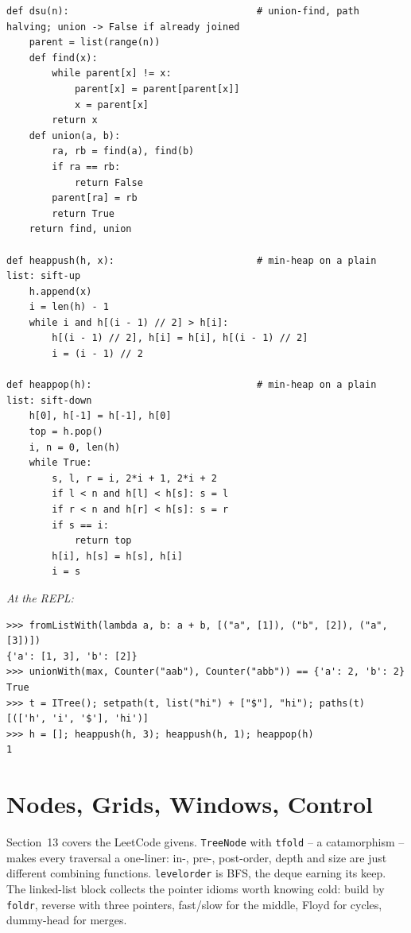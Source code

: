 \documentclass[11pt,letterpaper]{book}
\begin{document}
\begin{lstlisting}[style=code]
def dsu(n):                                 # union-find, path halving; union -> False if already joined
    parent = list(range(n))
    def find(x):
        while parent[x] != x:
            parent[x] = parent[parent[x]]
            x = parent[x]
        return x
    def union(a, b):
        ra, rb = find(a), find(b)
        if ra == rb:
            return False
        parent[ra] = rb
        return True
    return find, union

def heappush(h, x):                         # min-heap on a plain list: sift-up
    h.append(x)
    i = len(h) - 1
    while i and h[(i - 1) // 2] > h[i]:
        h[(i - 1) // 2], h[i] = h[i], h[(i - 1) // 2]
        i = (i - 1) // 2

def heappop(h):                             # min-heap on a plain list: sift-down
    h[0], h[-1] = h[-1], h[0]
    top = h.pop()
    i, n = 0, len(h)
    while True:
        s, l, r = i, 2*i + 1, 2*i + 2
        if l < n and h[l] < h[s]: s = l
        if r < n and h[r] < h[s]: s = r
        if s == i:
            return top
        h[i], h[s] = h[s], h[i]
        i = s
\end{lstlisting}

\noindent\textit{At the REPL:}
\begin{lstlisting}[style=spec]
>>> fromListWith(lambda a, b: a + b, [("a", [1]), ("b", [2]), ("a", [3])])
{'a': [1, 3], 'b': [2]}
>>> unionWith(max, Counter("aab"), Counter("abb")) == {'a': 2, 'b': 2}
True
>>> t = ITree(); setpath(t, list("hi") + ["$"], "hi"); paths(t)
[(['h', 'i', '$'], 'hi')]
>>> h = []; heappush(h, 3); heappush(h, 1); heappop(h)
1
\end{lstlisting}
\chapter{Nodes, Grids, Windows, Control}

Section~13 covers the LeetCode givens. \texttt{TreeNode} with \texttt{tfold} --
a catamorphism -- makes every traversal a one-liner: in-, pre-, post-order,
depth and size are just different combining functions. \texttt{levelorder} is
BFS, the deque earning its keep. The linked-list block collects the pointer
idioms worth knowing cold: build by \texttt{foldr}, reverse with three
pointers, fast/slow for the middle, Floyd for cycles, dummy-head for merges.
\end{document}
